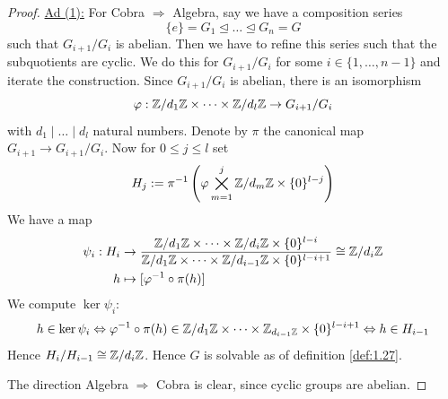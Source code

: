 \documentclass[twoside = false,	%
		headsepline,		%
		parskip = true,
		]{scrbook}						%
\begin{document}
         \begin{proof}
             \underline{Ad (1):} For Cobra $\Rightarrow$ Algebra, say we have a composition series
             \begin{equation*}
                 \{e\} = G_1 \trianglelefteq \dots \trianglelefteq G_n = G
             \end{equation*}
             such that $G_{i+1}/G_i$ is abelian. Then we have to refine this series such that the subquotients are cyclic. We do this for $G_{i+1}/G_i$ for some $i \in \{1,\dots,n-1\}$ and iterate the construction. Since $G_{i+1}/G_i$ is abelian, there is an isomorphism
             \begin{equation*}
                 \varphi: \mathbb Z/d_1\mathbb Z \times \dots \times \mathbb Z/d_l\mathbb Z \to G_{i+1}/G_i
             \end{equation*}
             with $d_1 \mid \dots \mid d_l$ natural numbers. Denote by $\pi$ the canonical map $G_{i+1} \to G_{i+1}/G_i$. Now for $0 \leq j \leq l$ set
             \begin{equation*}
                 H_j:= \pi^{-1}\left( \varphi \bigtimes_{m=1}^j \mathbb Z/d_m\mathbb Z \times \{0\}^{l-j}\right)
             \end{equation*}
             We have a map
             \begin{equation*}
                \begin{split}
                    \psi_i: H_i &\to \frac{\mathbb Z/d_1\mathbb Z \times \dots \times \mathbb Z/d_i\mathbb Z \times \{0\}^{l-i} }{\mathbb Z/d_1\mathbb Z \times \dots \times \mathbb Z/d_{i-1} \mathbb Z \times \{0\}^{l-i+1}} \cong \mathbb Z/d_i \mathbb Z \\
                    h &\mapsto [\varphi^{-1} \circ \pi (h)]
                \end{split}
             \end{equation*}
             We compute $\ker \psi_i$:
             \begin{equation*}
                 h \in \ker \psi_i \Leftrightarrow \varphi^{-1} \circ \pi(h) \in \mathbb Z/d_1 \mathbb Z \times \dots \times \mathbb Z_{d_{i-1}\mathbb Z} \times \{0\}^{l-i+1} \Leftrightarrow h \in H_{i-1}
             \end{equation*}
             Hence $H_i/H_{i-1} \cong \mathbb Z/d_i\mathbb Z$. Hence $G$ is solvable as of definition \ref{def:1.27}.

             The direction Algebra $\Rightarrow$ Cobra is clear, since cyclic groups are abelian.
         \end{proof}
        
\end{document}
